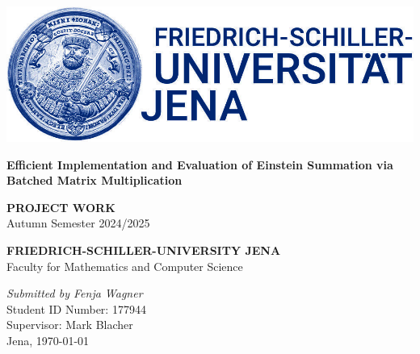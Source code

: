 \documentclass[12pt]{scrbook}
\begin{document}
\begin{titlepage}
    \begin{center}

        \begin{spacing}{1.5}
            \includegraphics[scale=0.25]{images/Bildmarke_blue_8cm.jpg}
            \vspace*{\fill}
        \end{spacing}
        \begin{spacing}{2.5}
            \textbf{\huge Efficient Implementation and Evaluation of Einstein Summation via Batched Matrix Multiplication}\\[0.5cm]
            \vspace*{\fill}
            \begin{spacing}{1.5}
                \textbf{PROJECT WORK\\}
                Autumn Semester 2024/2025
            \end{spacing}
        \end{spacing}

        \vspace*{\fill}

        \begin{spacing}{1.15}
            \textbf{FRIEDRICH-SCHILLER-UNIVERSITY JENA\\}
            Faculty for Mathematics and Computer Science

            \vspace*{\fill}

            \textit{Submitted by Fenja Wagner}\\
            Student ID Number: 177944\\
            Supervisor: Mark Blacher\\
            Jena, \today

        \end{spacing}
    \end{center}
\end{titlepage}
\end{document}
